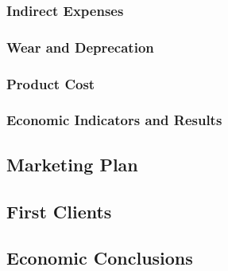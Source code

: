 \subsubsection{Indirect Expenses}

\subsubsection{Wear and Deprecation}

\subsubsection{Product Cost}

\subsubsection{Economic Indicators and Results}

\subsection{Marketing Plan}

\subsection{First Clients}

\subsection{Economic Conclusions}






\clearpage
